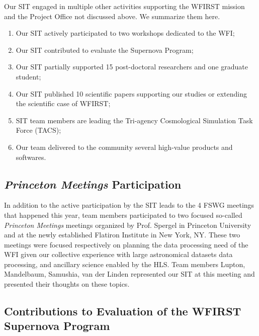 

\begin{summary}
Our SIT engaged in multiple other activities supporting the WFIRST mission and the Project Office not discussed above. We summarize them here.
\begin{enumerate}
\item Our SIT actively participated to two workshops dedicated to the WFI;
\item Our SIT contributed to evaluate the Supernova Program;
\item Our SIT partially supported 15 post-doctoral researchers and one graduate student;
\item Our SIT published 10 scientific papers supporting our studies or extending the scientific case of WFIRST;
\item SIT team members are leading the Tri-agency Cosmological Simulation Task Force (TACS);
\item Our team delivered to the community several high-value products and softwares.
\end{enumerate}
\end{summary}


\subsection{\emph{Princeton Meetings} Participation}

In addition to the active participation by the SIT leads to the 4 FSWG meetings that happened this year, team members participated to two focused so-called \emph{Princeton Meetings} meetings organized by Prof. Spergel in Princeton University and at the newly established Flatiron Institute in  New York, NY. These two meetings were focused respectively on planning the data processing need of the WFI given our collective experience with large astronomical datasets data processing, and ancillary science enabled by the HLS. Team members Lupton, Mandelbaum, Samushia, van der Linden represented our SIT at this meeting and presented their thoughts on these topics.

\subsection{Contributions to Evaluation of the WFIRST Supernova Program}

